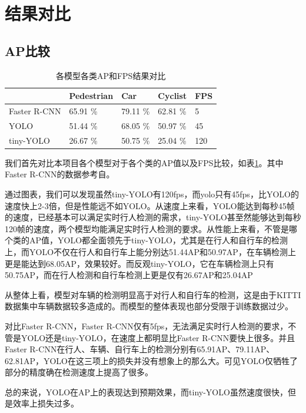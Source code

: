 \section{结果对比}{
	\subsection{AP比较}
	\begin{table}  
	\caption{各模型各类AP和FPS结果对比}  
	\begin{tabular}{l|p{2cm}p{2cm}p{2cm}p{2cm}}  
	\hline  
	             & Pedestrian & Car      & Cyclist  & FPS \\  
	\hline  
	Faster R-CNN & 65.91 \%   & 79.11 \% & 62.81 \% & 5   \\  
	YOLO         & 51.44 \%   & 68.05 \% & 50.97 \% & 45  \\
	tiny-YOLO    & 26.67 \%   & 50.75 \% & 25.04 \% & 120 \\
	\hline
	\end{tabular}
	\label{AP}
	\end{table} 
	我们首先对比本项目各个模型对于各个类的AP值以及FPS比较，如表\ref{AP}。其中Faster R-CNN的数据参考自\cite{KITTI}。

	通过图表，我们可以发现虽然tiny-YOLO有120fps，而yolo只有45fps，比YOLO的速度快上2-3倍，但是性能远不如YOLO。从速度上来看，YOLO能达到每秒45帧的速度，已经基本可以满足实时行人检测的需求，tiny-YOLO甚至然能够达到每秒120帧的速度，两个模型均能满足实时行人检测的要求。从性能上来看，不管是哪个类的AP值，YOLO都全面领先于tiny-YOLO，尤其是在行人和自行车的检测上，而YOLO不仅在行人和自行车上能分别达51.44AP和50.97AP，在车辆检测上更是能达到68.05AP，效果较好。而反观tiny-YOLO，它在车辆检测上只有50.75AP，而在行人检测和自行车检测上更是仅有26.67AP和25.04AP

	从整体上看，模型对车辆的检测明显高于对行人和自行车的检测，这是由于KITTI数据集中车辆数据较多造成的。而模型的整体表现也部分受限于训练数据过少。

	对比Faster R-CNN，Faster R-CNN仅有5fps，无法满足实时行人检测的要求，不管是YOLO还是tiny-YOLO，在速度上都明显比Faster R-CNN要快上很多。并且Faster R-CNN在行人、车辆、自行车上的检测分别有65.91AP、79.11AP、62.81AP，YOLO在这三项上的损失并没有想象上的那么大。可见YOLO仅牺牲了部分的精度确在检测速度上提高了很多。

	总的来说，YOLO在AP上的表现达到预期效果，而tiny-YOLO虽然速度很快，但是效率上损失过多。

}
